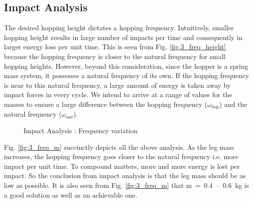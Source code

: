 \subsection*{Impact Analysis}
The desired hopping height dictates a hopping frequency. Intuitively, smaller hopping height results in 
large number of impacts per time and consequently in larger energy loss per unit time. This is seen from 
Fig. \ref{fig:3_freq_height} because the hopping frequency is closer to the natural frequency for small 
hopping heights. However, beyond this consideration, since the hopper is a spring mass system, it 
possesses a natural frequency of its own. If the hopping frequency is near to this natural frequency, a 
large amount of energy is taken away by impact forces in every cycle. We intend to arrive at a range of 
values for the masses to ensure a large difference between the hopping frequency ($\omega_{hop}$) and the 
natural frequency ($\omega_{nat}$).
\begin{figure}[!h]
\centering
{}
\caption{Impact Analysis : Frequency variation}
\label{fig:4_freq_var}
\end{figure}
Fig. \ref{fig:3_freq_m} succinctly depicts all the above analysis. As the leg mass increases, the hopping frequency goes closer to the natural frequency i.e. more impact per unit time. To compound matters, more and more energy is lost per impact. So the conclusion from impact analysis is that the leg mass should be as low as possible. It is also seen from Fig. \ref{fig:3_freq_m} that \mbox{m = 0.4 -- 0.6 kg} is a good solution as well as an achievable one. 

